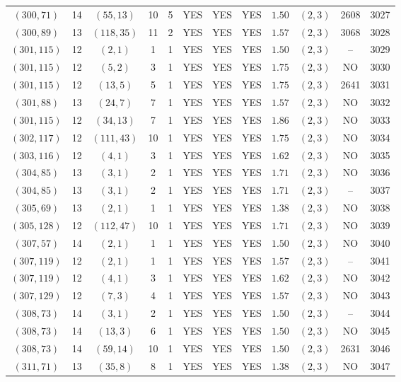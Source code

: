 \begin{longtable}{|c|c|c|c|c|c|c|c|c|c|c|c|}
$(300,71)$ & 14 & $(55,13)$ & 10 & 5 & YES & YES & YES & $1.50$ & $(2,3)$ & 2608 & 3027\\
$(300,89)$ & 13 & $(118,35)$ & 11 & 2 & YES & YES & YES & $1.57$ & $(2,3)$ & 3068 & 3028\\
$(301,115)$ & 12 & $(2,1)$ & 1 & 1 & YES & YES & YES & $1.50$ & $(2,3)$ & -- & 3029\\
$(301,115)$ & 12 & $(5,2)$ & 3 & 1 & YES & YES & YES & $1.75$ & $(2,3)$ & NO & 3030\\
$(301,115)$ & 12 & $(13,5)$ & 5 & 1 & YES & YES & YES & $1.75$ & $(2,3)$ & 2641 & 3031\\
$(301,88)$ & 13 & $(24,7)$ & 7 & 1 & YES & YES & YES & $1.57$ & $(2,3)$ & NO & 3032\\
$(301,115)$ & 12 & $(34,13)$ & 7 & 1 & YES & YES & YES & $1.86$ & $(2,3)$ & NO & 3033\\
$(302,117)$ & 12 & $(111,43)$ & 10 & 1 & YES & YES & YES & $1.75$ & $(2,3)$ & NO & 3034\\
$(303,116)$ & 12 & $(4,1)$ & 3 & 1 & YES & YES & YES & $1.62$ & $(2,3)$ & NO & 3035\\
$(304,85)$ & 13 & $(3,1)$ & 2 & 1 & YES & YES & YES & $1.71$ & $(2,3)$ & NO & 3036\\
$(304,85)$ & 13 & $(3,1)$ & 2 & 1 & YES & YES & YES & $1.71$ & $(2,3)$ & -- & 3037\\
$(305,69)$ & 13 & $(2,1)$ & 1 & 1 & YES & YES & YES & $1.38$ & $(2,3)$ & NO & 3038\\
$(305,128)$ & 12 & $(112,47)$ & 10 & 1 & YES & YES & YES & $1.71$ & $(2,3)$ & NO & 3039\\
$(307,57)$ & 14 & $(2,1)$ & 1 & 1 & YES & YES & YES & $1.50$ & $(2,3)$ & NO & 3040\\
$(307,119)$ & 12 & $(2,1)$ & 1 & 1 & YES & YES & YES & $1.57$ & $(2,3)$ & -- & 3041\\
$(307,119)$ & 12 & $(4,1)$ & 3 & 1 & YES & YES & YES & $1.62$ & $(2,3)$ & NO & 3042\\
$(307,129)$ & 12 & $(7,3)$ & 4 & 1 & YES & YES & YES & $1.57$ & $(2,3)$ & NO & 3043\\
$(308,73)$ & 14 & $(3,1)$ & 2 & 1 & YES & YES & YES & $1.50$ & $(2,3)$ & -- & 3044\\
$(308,73)$ & 14 & $(13,3)$ & 6 & 1 & YES & YES & YES & $1.50$ & $(2,3)$ & NO & 3045\\
$(308,73)$ & 14 & $(59,14)$ & 10 & 1 & YES & YES & YES & $1.50$ & $(2,3)$ & 2631 & 3046\\
$(311,71)$ & 13 & $(35,8)$ & 8 & 1 & YES & YES & YES & $1.38$ & $(2,3)$ & NO & 3047\\

\end{longtable}
